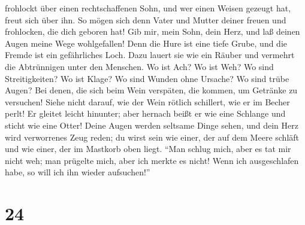 frohlockt über einen rechtschaffenen Sohn, und wer einen Weisen gezeugt
hat, freut sich über ihn.  So mögen sich denn Vater und
Mutter deiner freuen und frohlocken, die dich geboren hat!
 Gib mir, mein Sohn, dein Herz, und laß deinen Augen
meine Wege wohlgefallen!  Denn die Hure ist eine tiefe
Grube, und die Fremde ist ein gefährliches Loch.  Dazu
lauert sie wie ein Räuber und vermehrt die Abtrünnigen unter den
Menschen.  Wo ist Ach? Wo ist Weh? Wo sind
Streitigkeiten? Wo ist Klage? Wo sind Wunden ohne Ursache? Wo sind trübe
Augen?  Bei denen, die sich beim Wein verspäten, die
kommen, um Getränke zu versuchen!  Siehe nicht darauf,
wie der Wein rötlich schillert, wie er im Becher perlt! 
Er gleitet leicht hinunter; aber hernach beißt er wie eine Schlange und
sticht wie eine Otter!  Deine Augen werden seltsame Dinge
sehen, und dein Herz wird verworrenes Zeug reden;  du
wirst sein wie einer, der auf dem Meere schläft und wie einer, der im
Mastkorb oben liegt.  ``Man schlug mich, aber es tat mir
nicht weh; man prügelte mich, aber ich merkte es nicht! Wenn ich
ausgeschlafen habe, so will ich ihn wieder aufsuchen!''

\hypertarget{section-23}{%
\section{24}\label{section-23}}

